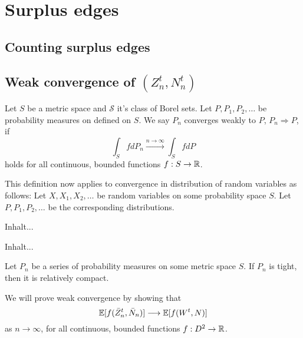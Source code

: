 
\chapter{Surplus edges}

\section{Counting surplus edges}

\begin{figure}
	
\end{figure}

\section{Weak convergence of $(Z^t_n, N^t_n)$}

\begin{definition}
	Let $S$ be a metric space and $\mathcal{S}$ it's class of Borel sets.
	Let $P, P_1, P_2, \dots$ be probability measures on defined on $S$.
	We say $P_n$ converges weakly to $P$, $P_n \Rightarrow P$, if
	\begin{equation} 
	\int_S fdP_n \xrightarrow{n \rightarrow \infty} \int_S fdP
	\end{equation}
	holds for all continuous, bounded functions $f: S \rightarrow \mathbb{R}$.
\end{definition}

This definition now applies to convergence in distribution of random variables as follows:
Let $X, X_1, X_2, \dots$ be random variables on some probability space $S$.
Let $P, P_1, P_2, \dots$ be the corresponding distributions. 

\begin{definition}[Tightness]
	Inhalt...
\end{definition}

\begin{definition}
	Inhalt...
\end{definition}

\begin{theorem}
	Let $P_n$ be a series of probability measures on some metric space $S$. If $P_n$ is tight, then it is relatively compact.
\end{theorem}



We will prove weak convergence by showing that
\begin{equation}
\mathbb{E}[ f(\bar{Z}^t_n, \bar{N}_n) ] \longrightarrow \mathbb{E}[ f(W^t, N) ]
\end{equation}
as $n \rightarrow \infty$, 
for all continuous, bounded functions 
$f: D^2 \rightarrow \mathbb{R}$.
